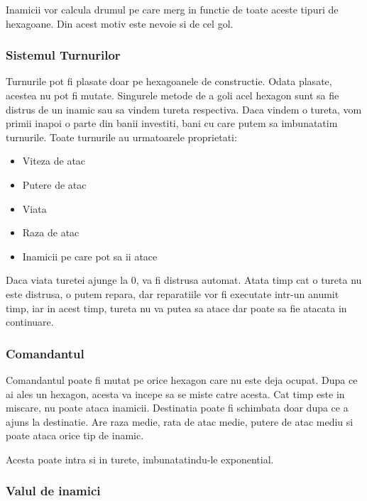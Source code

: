 \documentclass[12pt, a4paper]{article}
\begin{document}
	Inamicii vor calcula drumul pe care merg in functie de toate aceste tipuri de hexagoane. Din acest motiv este nevoie si de cel gol.
	


	
	\subsubsection{Sistemul Turnurilor}
	
	Turnurile pot fi plasate doar pe hexagoanele de constructie. Odata plasate, acestea nu pot fi mutate. Singurele metode de a goli acel hexagon sunt sa fie distrus de un inamic sau sa vindem tureta respectiva. Daca vindem o tureta, vom primii inapoi o parte din banii investiti, bani cu care putem sa imbunatatim turnurile. Toate turnurile au urmatoarele proprietati:
	\begin{itemize}
		\item Viteza de atac
		\item Putere de atac
		\item Viata
		\item Raza de atac
		\item Inamicii pe care pot sa ii atace
	\end{itemize}

	Daca viata turetei ajunge la 0, va fi distrusa automat. Atata timp cat o tureta nu este distrusa, o putem repara, dar reparatiile vor fi executate intr-un anumit timp, iar in acest timp, tureta nu va putea sa atace dar poate sa fie atacata in continuare.
	
	\subsubsection{Comandantul}
	
	Comandantul poate fi mutat pe orice hexagon care nu este deja ocupat. Dupa ce ai ales un hexagon, acesta va incepe sa se miste catre acesta. Cat timp este in miscare, nu poate ataca inamicii. Destinatia poate fi schimbata doar dupa ce a ajuns la destinatie. Are raza medie, rata de atac medie, putere de atac mediu si poate ataca orice tip de inamic.
	
	Acesta poate intra si in turete, imbunatatindu-le exponential.
	
	\subsubsection{Valul de inamici}
	
\end{document}
